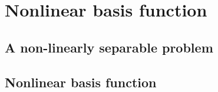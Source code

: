 \section{Nonlinear basis function}

\subsection{A non-linearly separable problem}

\begin{frame}\frametitle{\subsecname}
\end{frame}

\subsection{Nonlinear basis function}


